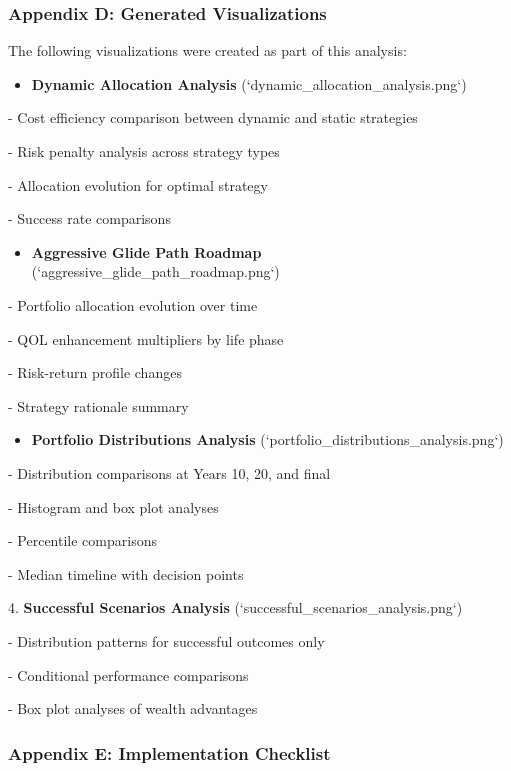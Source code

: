 \documentclass[11pt,letterpaper]{article}
\begin{document}
\subsubsection{Appendix D: Generated Visualizations}

The following visualizations were created as part of this analysis:


\begin{itemize}
\item \textbf{Dynamic Allocation Analysis} (`dynamic\_allocation\_analysis.png`)
\end{itemize}
   - Cost efficiency comparison between dynamic and static strategies

   - Risk penalty analysis across strategy types

   - Allocation evolution for optimal strategy

   - Success rate comparisons


\begin{itemize}
\item \textbf{Aggressive Glide Path Roadmap} (`aggressive\_glide\_path\_roadmap.png`)
\end{itemize}
   - Portfolio allocation evolution over time

   - QOL enhancement multipliers by life phase

   - Risk-return profile changes

   - Strategy rationale summary


\begin{itemize}
\item \textbf{Portfolio Distributions Analysis} (`portfolio\_distributions\_analysis.png`)
\end{itemize}
   - Distribution comparisons at Years 10, 20, and final

   - Histogram and box plot analyses

   - Percentile comparisons

   - Median timeline with decision points


4. \textbf{Successful Scenarios Analysis} (`successful\_scenarios\_analysis.png`)

   - Distribution patterns for successful outcomes only

   - Conditional performance comparisons

   - Box plot analyses of wealth advantages


\subsubsection{Appendix E: Implementation Checklist}
\end{document}
